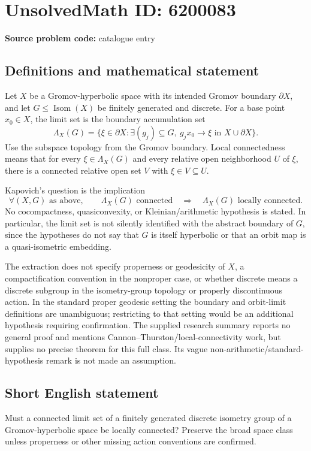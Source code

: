 \documentclass[11pt]{article}
\begin{document}
\section*{UnsolvedMath ID: 6200083}
\textbf{Source problem code:} catalogue entry
\subsection{Definitions and mathematical statement}
Let \(X\) be a Gromov-hyperbolic space with its intended Gromov boundary \(\partial X\), and let \(G\le\operatorname{Isom}(X)\) be finitely generated and discrete. For a base point \(x_0\in X\), the limit set is the boundary accumulation set
\[
\Lambda_X(G)=\{\xi\in\partial X:\exists(g_j)\subseteq G,
\ g_jx_0\longrightarrow\xi\text{ in }X\cup\partial X\}.
\]
Use the subspace topology from the Gromov boundary. Local connectedness means that for every \(\xi\in\Lambda_X(G)\) and every relative open neighborhood \(U\) of \(\xi\), there is a connected relative open set \(V\) with \(\xi\in V\subseteq U\).

Kapovich's question is the implication
\[
\forall(X,G)\text{ as above},\qquad
\Lambda_X(G)\text{ connected}\quad\Longrightarrow\quad
\Lambda_X(G)\text{ locally connected}.
\]
No cocompactness, quasiconvexity, or Kleinian/arithmetic hypothesis is stated. In particular, the limit set is not silently identified with the abstract boundary of \(G\), since the hypotheses do not say that \(G\) is itself hyperbolic or that an orbit map is a quasi-isometric embedding.

The extraction does not specify properness or geodesicity of \(X\), a compactification convention in the nonproper case, or whether discrete means a discrete subgroup in the isometry-group topology or properly discontinuous action. In the standard proper geodesic setting the boundary and orbit-limit definitions are unambiguous; restricting to that setting would be an additional hypothesis requiring confirmation. The supplied research summary reports no general proof and mentions Cannon--Thurston/local-connectivity work, but supplies no precise theorem for this full class. Its vague non-arithmetic/standard-hypothesis remark is not made an assumption.
\subsection{Short English statement}
Must a connected limit set of a finitely generated discrete isometry group of a Gromov-hyperbolic space be locally connected? Preserve the broad space class unless properness or other missing action conventions are confirmed.
\end{document}
